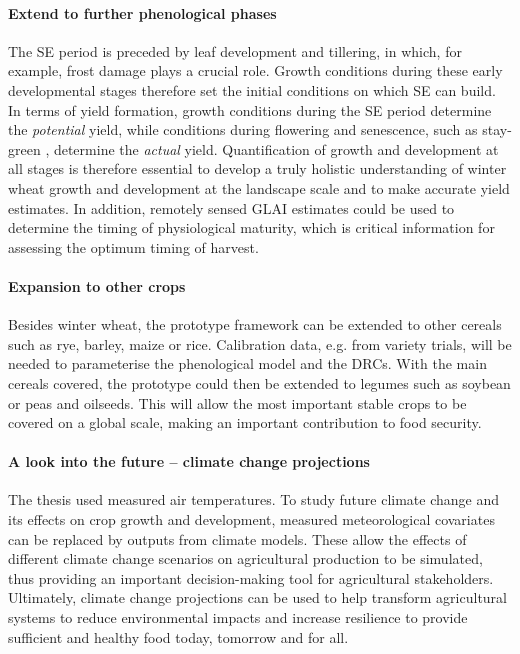 \paragraph{Extend to further phenological phases}
The \gls{SE} period is preceded by leaf development and tillering, in which, for example, frost damage \citep{tschurr_frost_2023} plays a crucial role. Growth conditions during these early developmental stages therefore set the initial conditions on which \gls{SE} can build. In terms of yield formation, growth conditions during the \gls{SE} period determine the \textsl{potential} yield, while conditions during flowering and senescence, such as stay-green \citep{thomas_stay-green_2014}, determine the \textsl{actual} yield. Quantification of growth and development at all stages is therefore essential to develop a truly holistic understanding of winter wheat growth and development at the landscape scale and to make accurate yield estimates. In addition, remotely sensed \gls{GLAI} estimates could be used to determine the timing of physiological maturity, which is critical information for assessing the optimum timing of harvest.

\paragraph{Expansion to other crops}
Besides winter wheat, the prototype framework can be extended to other cereals such as rye, barley, maize or rice. Calibration data, e.g. from variety trials, will be needed to parameterise the phenological model and the \gls{DRC}s. With the main cereals covered, the prototype could then be extended to legumes such as soybean or peas and oilseeds. This will allow the most important stable crops to be covered on a global scale, making an important contribution to food security.

\paragraph{A look into the future -- climate change projections}
The thesis used measured air temperatures. To study future climate change and its effects on crop growth and development, measured meteorological covariates can be replaced by outputs from climate models. These allow the effects of different climate change scenarios on agricultural production to be simulated, thus providing an important decision-making tool for agricultural stakeholders. Ultimately, climate change projections can be used to help transform agricultural systems to reduce environmental impacts and increase resilience to provide sufficient and healthy food today, tomorrow and for all.
